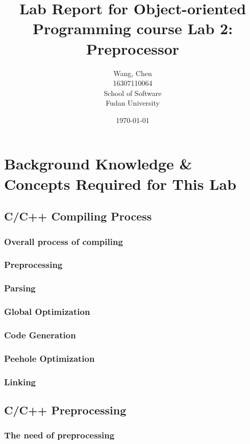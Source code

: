 \documentclass[a4paper]{report}
\title{Lab Report for Object-oriented Programming course \newline
 Lab 2: Preprocessor}
\author{Wang, Chen \\ 16307110064 \\ School of Software\\ Fudan University}
\date{\today}
\begin{document}
\maketitle

\tableofcontents

\chapter{Background Knowledge \& Concepts Required for This Lab}
\section{C/C++ Compiling Process}

\subsection{Overall process of compiling}

\subsection{Preprocessing}


\subsection{Parsing}

\subsection{Global Optimization}


\subsection{Code Generation}
\subsection{Peehole Optimization}
\subsection{Linking}
\section{C/C++ Preprocessing}

\subsection{The need of preprocessing}
\end{document}
